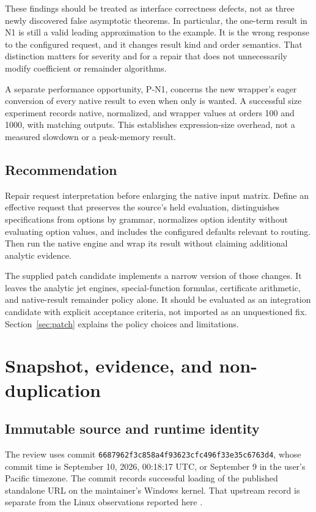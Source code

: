 \documentclass[11pt,a4paper]{article}
\newcommand{\code}[1]{\texttt{\detokenize{#1}}}
\newcommand{\pin}{6687962f3c858a4f93623cfc496f33e35c6763d4}
\begin{document}
These findings should be treated as interface correctness defects, not as three newly discovered false asymptotic theorems. In particular, the one-term result in N1 is still a valid leading approximation to the example. It is the wrong response to the configured request, and it changes result kind and order semantics. That distinction matters for severity and for a repair that does not unnecessarily modify coefficient or remainder algorithms.

A separate performance opportunity, P-N1, concerns the new wrapper's eager conversion of every native result to \code{Normal} even when only \code{"NativeResult"} is wanted. A successful size experiment records native, normalized, and wrapper \code{ByteCount} values at orders 100 and 1000, with matching outputs. This establishes expression-size overhead, not a measured slowdown or a peak-memory result.

\subsection{Recommendation}

Repair request interpretation before enlarging the native input matrix. Define an effective request that preserves the source's held evaluation, distinguishes specifications from options by grammar, normalizes option identity without evaluating option values, and includes the configured defaults relevant to routing. Then run the native engine and wrap its result without claiming additional analytic evidence.

The supplied patch candidate implements a narrow version of those changes. It leaves the analytic jet engines, special-function formulas, certificate arithmetic, and native-result remainder policy alone. It should be evaluated as an integration candidate with explicit acceptance criteria, not imported as an unquestioned fix. Section~\ref{sec:patch} explains the policy choices and limitations.

\section{Snapshot, evidence, and non-duplication}
\label{sec:scope}

\subsection{Immutable source and runtime identity}

The review uses commit \texttt{\pin}, whose commit time is September 10, 2026, 00:18:17 UTC, or September 9 in the user's Pacific timezone. The commit records successful loading of the published standalone URL on the maintainer's Windows kernel. That upstream record is separate from the Linux observations reported here \cite{commit,readme}.
\end{document}
